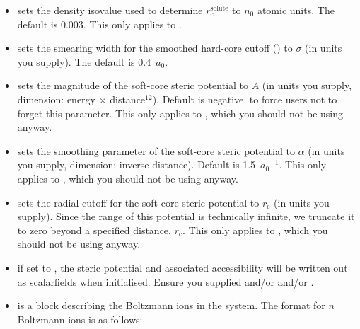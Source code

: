 \documentclass[letterpaper,10pt,english]{sphinxmanual}
\begin{document}
\begin{itemize}
\item {} 
 sets the density isovalue used to
determine \(r_{\textrm{c}}^{\textrm{solute}}\) to \(n_0\)
atomic units. The default is 0.003. This only applies to
.

\item {} 
 sets the smearing width for the
smoothed hard-core cutoff () to
\(\sigma\) (in units you supply). The default is
0.4 \(a_0\).

\item {} 
 sets the magnitude of the soft-core
steric potential to \(A\) (in units you supply, dimension: energy
\(\times\) distance\(^{12}\)). Default is negative, to
force users not to forget this parameter. This only applies to
, which you should not be using anyway.

\item {} 
 sets the smoothing parameter
of the soft-core steric potential to \(\alpha\) (in units you
supply, dimension: inverse distance). Default is
1.5 \({a_0}^{-1}\). This only applies to
, which you should not be using anyway.

\item {} 
 sets the radial cutoff for the
soft-core steric potential to \(r_{\textrm{c}}\) (in units you
supply). Since the range of this potential is technically infinite,
we truncate it to zero beyond a specified distance,
\(r_{\textrm{c}}\). This only applies to
, which you should not be using anyway.

\item {} 
 if set to , the steric potential and
associated accessibility will be written out as scalarfields when
initialised. Ensure you supplied  and/or
 and/or .

\item {} 
 is a block describing the Boltzmann ions in the system.
The format for \(n\) Boltzmann ions is as follows:


\end{itemize}
\end{document}
